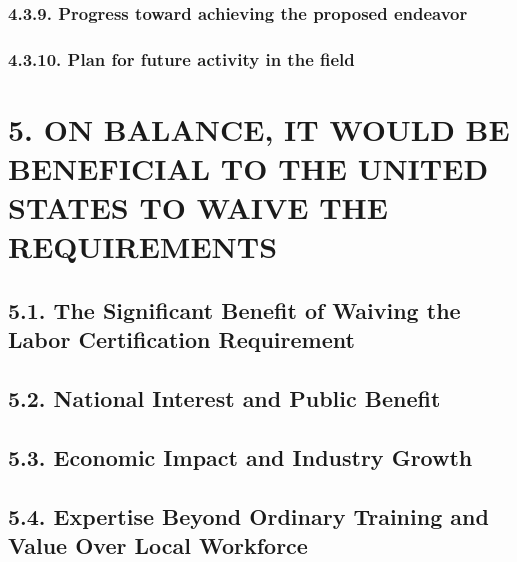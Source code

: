 \subsubsection{\texorpdfstring{4.3.9. Progress toward achieving the proposed endeavor}{4.3.9. Progress toward achieving the proposed endeavor}}\label{progress-toward-achieving-the-proposed-endeavor}

\subsubsection{\texorpdfstring{4.3.10. Plan for future activity in the field}{4.3.10. Plan for future activity in the field}}\label{plan-for-future-activity-in-the-field}

\section{\texorpdfstring{5. ON BALANCE, IT WOULD BE BENEFICIAL TO THE UNITED STATES TO WAIVE THE REQUIREMENTS}{5. ON BALANCE, IT WOULD BE BENEFICIAL TO THE UNITED STATES TO WAIVE THE REQUIREMENTS}}\label{on-balance-it-would-be-beneficial-to-the-united-states-to-waive-the-requirements}

\subsection{\texorpdfstring{5.1. The Significant Benefit of Waiving the Labor Certification Requirement}{5.1. The Significant Benefit of Waiving the Labor Certification Requirement}}


\subsection{\texorpdfstring{5.2. National Interest and Public Benefit}{5.2. National Interest and Public Benefit}}

\subsection{\texorpdfstring{5.3. Economic Impact and Industry Growth}{5.3. Economic Impact and Industry Growth}}

\subsection{\texorpdfstring{5.4. Expertise Beyond Ordinary Training and Value Over Local Workforce}{5.4. Expertise Beyond Ordinary Training and Value Over Local Workforce}}


